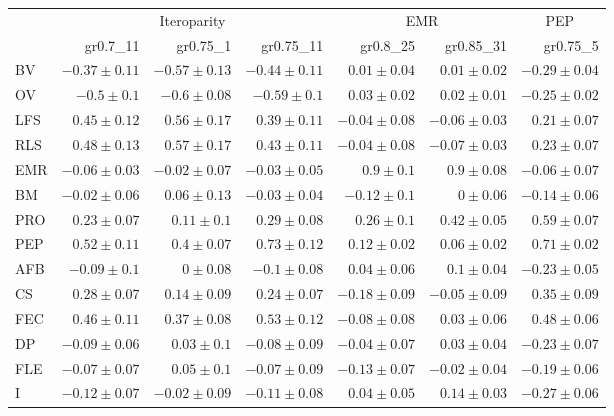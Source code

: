 \begin{landscape}
\begin{table}
\begin{footnotesize}
\begin{tabular}{@{}l|rrr|rr|r@{}}
\toprule
 & \multicolumn{3}{c|}{Iteroparity} & \multicolumn{2}{c|}{EMR} & \multicolumn{1}{c}{PEP}\\
 & gr0.7\_11 & gr0.75\_1 & gr0.75\_11 & gr0.8\_25 & gr0.85\_31 & gr0.75\_5\\
\midrule
BV & $-0.37 \pm 0.11$ & $-0.57 \pm 0.13$ & $-0.44 \pm 0.11$ & $0.01 \pm 0.04$ & $0.01 \pm 0.02$ & $-0.29 \pm 0.04$\\
OV & $-0.5 \pm 0.1$ & $-0.6 \pm 0.08$ & $-0.59 \pm 0.1$ & $0.03 \pm 0.02$ & $0.02 \pm 0.01$ & $-0.25 \pm 0.02$\\
LFS & $0.45 \pm 0.12$ & $0.56 \pm 0.17$ & $0.39 \pm 0.11$ & $-0.04 \pm 0.08$ & $-0.06 \pm 0.03$ & $0.21 \pm 0.07$\\
RLS & $0.48 \pm 0.13$ & $0.57 \pm 0.17$ & $0.43 \pm 0.11$ & $-0.04 \pm 0.08$ & $-0.07 \pm 0.03$ & $0.23 \pm 0.07$\\
EMR & $-0.06 \pm 0.03$ & $-0.02 \pm 0.07$ & $-0.03 \pm 0.05$ & $0.9 \pm 0.1$ & $0.9 \pm 0.08$ & $-0.06 \pm 0.07$\\
BM & $-0.02 \pm 0.06$ & $0.06 \pm 0.13$ & $-0.03 \pm 0.04$ & $-0.12 \pm 0.1$ & $0 \pm 0.06$ & $-0.14 \pm 0.06$\\
PRO & $0.23 \pm 0.07$ & $0.11 \pm 0.1$ & $0.29 \pm 0.08$ & $0.26 \pm 0.1$ & $0.42 \pm 0.05$ & $0.59 \pm 0.07$\\
PEP & $0.52 \pm 0.11$ & $0.4 \pm 0.07$ & $0.73 \pm 0.12$ & $0.12 \pm 0.02$ & $0.06 \pm 0.02$ & $0.71 \pm 0.02$\\
AFB & $-0.09 \pm 0.1$ & $0 \pm 0.08$ & $-0.1 \pm 0.08$ & $0.04 \pm 0.06$ & $0.1 \pm 0.04$ & $-0.23 \pm 0.05$\\
CS & $0.28 \pm 0.07$ & $0.14 \pm 0.09$ & $0.24 \pm 0.07$ & $-0.18 \pm 0.09$ & $-0.05 \pm 0.09$ & $0.35 \pm 0.09$\\
FEC & $0.46 \pm 0.11$ & $0.37 \pm 0.08$ & $0.53 \pm 0.12$ & $-0.08 \pm 0.08$ & $0.03 \pm 0.06$ & $0.48 \pm 0.06$\\
DP & $-0.09 \pm 0.06$ & $0.03 \pm 0.1$ & $-0.08 \pm 0.09$ & $-0.04 \pm 0.07$ & $0.03 \pm 0.04$ & $-0.23 \pm 0.07$\\
FLE & $-0.07 \pm 0.07$ & $0.05 \pm 0.1$ & $-0.07 \pm 0.09$ & $-0.13 \pm 0.07$ & $-0.02 \pm 0.04$ & $-0.19 \pm 0.06$\\
I & $-0.12 \pm 0.07$ & $-0.02 \pm 0.09$ & $-0.11 \pm 0.08$ & $0.04 \pm 0.05$ & $0.14 \pm 0.03$ & $-0.27 \pm 0.06$\\
\bottomrule
\end{tabular}


\end{footnotesize}
\end{table}
\end{landscape}
